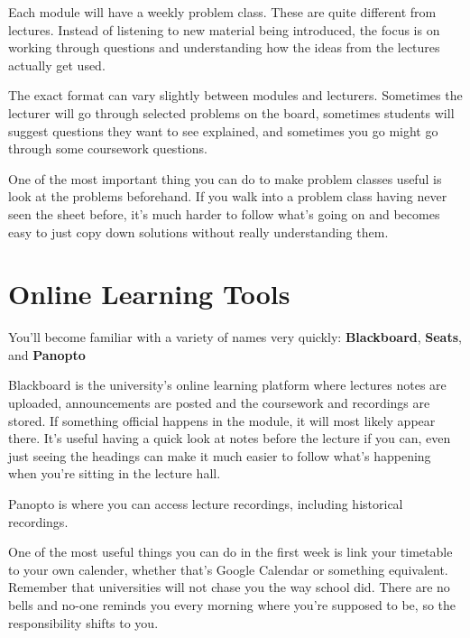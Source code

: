Each module will have a weekly problem class. These are quite different from lectures. Instead of listening to new material being introduced, the focus is on working through questions and understanding how the ideas from the lectures actually get used.

The exact format can vary slightly between modules and lecturers. Sometimes the lecturer will go through selected problems on the board, sometimes students will suggest questions they want to see explained, and sometimes you go might go through some coursework questions. 

One of the most important thing you can do to make problem classes useful is look at the problems beforehand. If you walk into a problem class having never seen the sheet before, it’s much harder to follow what’s going on and becomes easy to just copy down solutions without really understanding them.

\section{Online Learning Tools}



You'll become familiar with a variety of names very quickly: \textbf{Blackboard}, \textbf{Seats}, and \textbf{Panopto}

Blackboard is the university's online learning platform where lectures notes are uploaded, announcements are posted and the coursework and recordings are stored. If something official happens in the module, it will most likely appear there. It's useful having a quick look at notes before the lecture if you can, even just seeing the headings can make it much easier to follow what’s happening when you’re sitting in the lecture hall.

Panopto is where you can access lecture recordings, including historical recordings. 

One of the most useful things you can do in the first week is link your timetable to your own calender, whether that's Google Calendar or something equivalent. Remember that universities will not chase you the way school did. There are no bells and no-one reminds you every morning where you're supposed to be, so the responsibility shifts to you. 

